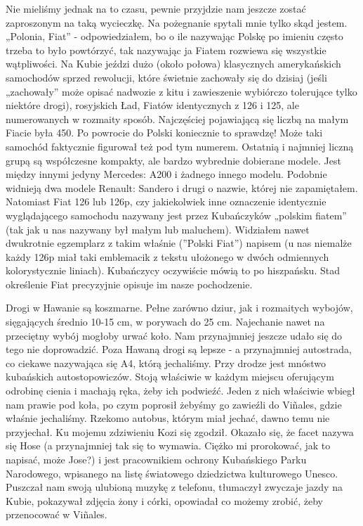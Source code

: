 Nie mieliśmy jednak na to czasu, pewnie przyjdzie nam jeszcze zostać zaproszonym na taką wycieczkę.
Na pożegnanie spytali mnie tylko skąd jestem.
„Polonia, Fiat” - odpowiedziałem, bo o ile nazywając Polskę po imieniu często trzeba to było powtórzyć, tak nazywając ja Fiatem rozwiewa się wszystkie wątpliwości.
Na Kubie jeździ dużo (około połowa) klasycznych amerykańskich samochodów sprzed rewolucji, które świetnie zachowały się do dzisiaj (jeśli „zachowały” może opisać nadwozie z kitu i zawieszenie wybiórczo tolerujące tylko niektóre drogi), rosyjskich Ład, Fiatów identycznych z 126 i 125, ale numerowanych w rozmaity sposób.
Najczęściej pojawiającą się liczbą na małym Fiacie była 450.
Po powrocie do Polski koniecznie to sprawdzę!
Może taki samochód faktycznie figurował też pod tym numerem.
Ostatnią i najmniej liczną grupą są współczesne kompakty, ale bardzo wybrednie dobierane modele.
Jest między innymi jedyny Mercedes: A200 i żadnego innego modelu.
Podobnie widnieją dwa modele Renault: Sandero i drugi o nazwie, której nie zapamiętałem.
Natomiast Fiat 126 lub 126p, czy jakiekolwiek inne oznaczenie identycznie wyglądającego samochodu nazywany jest przez Kubańczyków „polskim fiatem” (tak jak u nas nazywany był małym lub maluchem).
Widziałem nawet dwukrotnie egzemplarz z takim właśnie (”Polski Fiat”) napisem (u nas niemalże każdy 126p miał taki emblemacik z tekstu ułożonego w dwóch odmiennych kolorystycznie liniach).
Kubańczycy oczywiście mówią to po hiszpańsku.
Stad określenie Fiat precyzyjnie opisuje im nasze pochodzenie.
\par Drogi w Hawanie są koszmarne.
Pełne zarówno dziur, jak i rozmaitych wybojów, sięgających średnio 10-15 cm, w porywach do 25 cm.
Najechanie nawet na przeciętny wybój mogłoby urwać koło.
Nam przynajmniej jeszcze udało się do tego nie doprowadzić.
Poza Hawaną drogi są lepsze - a przynajmniej autostrada, co ciekawe nazywająca się A4, którą jechaliśmy.
Przy drodze jest mnóstwo kubańskich autostopowiczów.
Stoją właściwie w każdym miejscu oferującym odrobinę cienia i machają ręka, żeby ich podwieźć.
Jeden z nich właściwie wbiegł nam prawie pod koła, po czym poprosił żebyśmy go zawieźli do Viñales, gdzie właśnie jechaliśmy. Rzekomo autobus, którym miał jechać, dawno temu nie przyjechał.
Ku mojemu zdziwieniu Kozi się zgodził.
Okazało się, że facet nazywa się Hose (a przynajmniej tak się to wymawia.
Ciężko mi prorokować, jak to napisać, może Jose?) i jest pracownikiem ochrony Kubańskiego Parku Narodowego, wpisanego na listę światowego dziedzictwa kulturowego Unesco.
Puszczał nam swoją ulubioną muzykę z telefonu, tłumaczył zwyczaje jazdy na Kubie, pokazywał zdjęcia żony i córki, opowiadał co możemy zrobić, żeby przenocować w Viñales.
